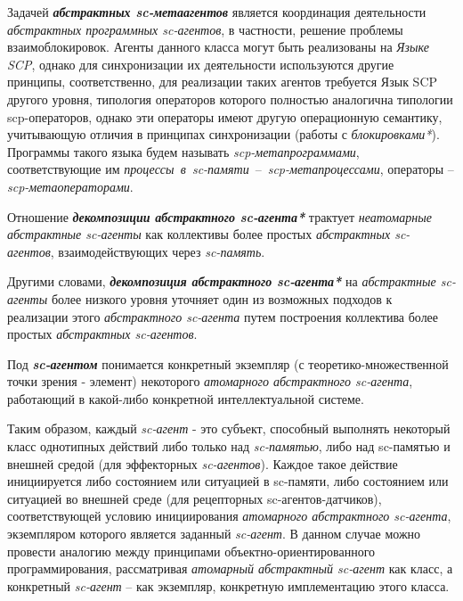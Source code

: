 Задачей \textbf{\textit{абстрактных sc-метаагентов}} является координация деятельности \textit{абстрактных программных sc-агентов}, в частности, решение проблемы взаимоблокировок. Агенты данного класса могут быть реализованы на \textit{Языке SCP}, однако для синхронизации их деятельности используются другие принципы, соответственно, для реализации таких агентов требуется Язык SCP другого уровня, типология операторов которого полностью аналогична типологии scp-операторов, однако эти операторы имеют другую операционную семантику, учитывающую отличия в принципах синхронизации (работы с \textit{блокировками*}). Программы такого языка будем называть \textit{scp-метапрограммами}, соответствующие им \mbox{\textit{процессы в sc-памяти} -- \textit{scp-метапроцессами}}, операторы -- \textit{scp-метаоператорами}.

\begin{SCn}
\end{SCn}

Отношение \textbf{\textit{декомпозиции абстрактного sc-агента*}} трактует \textit{неатомарные абстрактные sc-агенты} как коллективы более простых \textit{абстрактных sc-агентов}, взаимодействующих через \textit{sc-память}.
	
Другими словами, \textbf{\textit{декомпозиция абстрактного sc-агента*}} на \textit{абстрактные sc-агенты} более низкого уровня уточняет один из возможных подходов к реализации этого \textit{абстрактного sc-агента} путем построения коллектива более простых \textit{абстрактных sc-агентов}.

\begin{SCn}
\end{SCn}

Под \textbf{\textit{sc-агентом}} понимается конкретный экземпляр (с теоретико-множественной точки зрения - элемент) некоторого \textit{атомарного абстрактного sc-агента}, работающий в какой-либо конкретной интеллектуальной системе.
	
Таким образом, каждый \textit{sc-агент} - это субъект, способный выполнять некоторый класс однотипных действий либо только над \textit{sc-памятью}, либо над sc-памятью и внешней средой (для эффекторных \textit{sc-агентов}). Каждое такое действие инициируется либо состоянием или ситуацией в sc-памяти, либо состоянием или ситуацией во внешней среде (для рецепторных sc-агентов-датчиков),  соответствующей условию инициирования \textit{атомарного абстрактного sc-агента}, экземпляром которого является заданный \textit{sc-агент}. В данном случае можно провести аналогию между принципами объектно-ориентированного программирования, рассматривая \textit{атомарный абстрактный sc-агент} как класс, а конкретный \textit{sc-агент} – как экземпляр, конкретную имплементацию этого класса.
	
